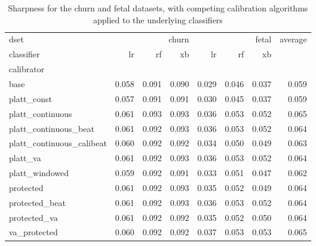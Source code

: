 \begin{table}
\caption{Sharpness for the churn and fetal datasets, with competing calibration algorithms applied to the underlying classifiers}
\begin{tabular}{l|rrr|rrr|r|}
dset & \multicolumn{3}{r}{churn} & \multicolumn{3}{r}{fetal} & average \\
classifier & lr & rf & xb & lr & rf & xb &  \\
calibrator &  &  &  &  &  &  &  \\
base & 0.058 & 0.091 & 0.090 & 0.029 & 0.046 & 0.037 & 0.059 \\
platt_const & 0.057 & 0.091 & 0.091 & 0.030 & 0.045 & 0.037 & 0.059 \\
platt_continuous & 0.061 & 0.093 & 0.093 & 0.036 & 0.053 & 0.052 & 0.065 \\
platt_continuous_beat & 0.061 & 0.092 & 0.093 & 0.036 & 0.053 & 0.052 & 0.064 \\
platt_continuous_calibeat & 0.060 & 0.092 & 0.092 & 0.034 & 0.050 & 0.049 & 0.063 \\
platt_va & 0.061 & 0.092 & 0.093 & 0.036 & 0.053 & 0.052 & 0.064 \\
platt_windowed & 0.059 & 0.092 & 0.091 & 0.033 & 0.051 & 0.047 & 0.062 \\
protected & 0.061 & 0.092 & 0.093 & 0.035 & 0.052 & 0.049 & 0.064 \\
protected_beat & 0.061 & 0.092 & 0.093 & 0.036 & 0.053 & 0.052 & 0.064 \\
protected_va & 0.061 & 0.092 & 0.092 & 0.035 & 0.052 & 0.050 & 0.064 \\
va_protected & 0.060 & 0.092 & 0.092 & 0.037 & 0.053 & 0.053 & 0.065 \\
\end{tabular}
\end{table}
